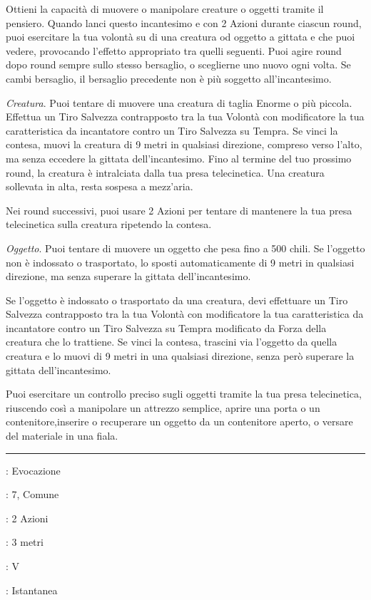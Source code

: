 \begin{multicols}{2}
Ottieni la capacità di muovere o manipolare creature o oggetti tramite il pensiero. Quando lanci questo incantesimo e con 2 Azioni durante ciascun round, puoi esercitare la tua volontà su di una creatura od oggetto a gittata e che puoi vedere, provocando l'effetto appropriato tra quelli seguenti. Puoi agire round dopo round sempre sullo stesso bersaglio, o sceglierne uno nuovo ogni volta. Se cambi bersaglio, il bersaglio precedente non è più soggetto all'incantesimo.

\emph{Creatura}. Puoi tentare di muovere una creatura di taglia Enorme o più piccola. Effettua un Tiro Salvezza contrapposto tra la tua Volontà con modificatore la tua caratteristica da incantatore contro un Tiro Salvezza su Tempra. Se vinci la contesa, muovi la creatura di 9 metri in qualsiasi direzione, compreso verso l'alto, ma senza eccedere la gittata dell'incantesimo. Fino al termine del tuo prossimo round, la creatura è intralciata dalla tua presa telecinetica. Una creatura sollevata in alta, resta sospesa a mezz'aria.

Nei round successivi, puoi usare 2 Azioni per tentare di mantenere la tua presa telecinetica sulla creatura ripetendo la contesa.

\emph{Oggetto}. Puoi tentare di muovere un oggetto che pesa fino a 500 chili. Se l'oggetto non è indossato o trasportato, lo sposti automaticamente di 9 metri in qualsiasi direzione, ma senza superare la gittata dell'incantesimo.

Se l'oggetto è indossato o trasportato da una creatura, devi effettuare un Tiro Salvezza contrapposto tra la tua Volontà con modificatore la tua caratteristica da incantatore contro un Tiro Salvezza su Tempra modificato da Forza della creatura che lo trattiene. Se vinci la contesa, trascini via l'oggetto da quella creatura e lo muovi di 9 metri in una qualsiasi direzione, senza però superare la gittata dell'incantesimo.

Puoi esercitare un controllo preciso sugli oggetti tramite la tua presa telecinetica, riuscendo così a manipolare un attrezzo semplice, aprire una porta o un contenitore,inserire o recuperare un oggetto da un contenitore aperto, o versare del materiale in una fiala.

\smallskip\noindent\rule{\linewidth}{2pt} \hypertarget{Teletrasporto}{}\smallskip{}
\noindent
\begin{description}[noitemsep, topsep=0pt, parsep=0pt, partopsep=0pt, leftmargin=0cm, labelwidth=2.8cm]
	\item[\textbf{Lista di Magia}]: Evocazione
	\item[\textbf{Livello}]: 7, Comune
	\item[\textbf{T. di Lancio}]: 2 Azioni
	\item[\textbf{Gittata}]: 3 metri
	\item[\textbf{Componenti}]: V
	\item[\textbf{Durata}]: Istantanea
\end{description}


\end{multicols}
